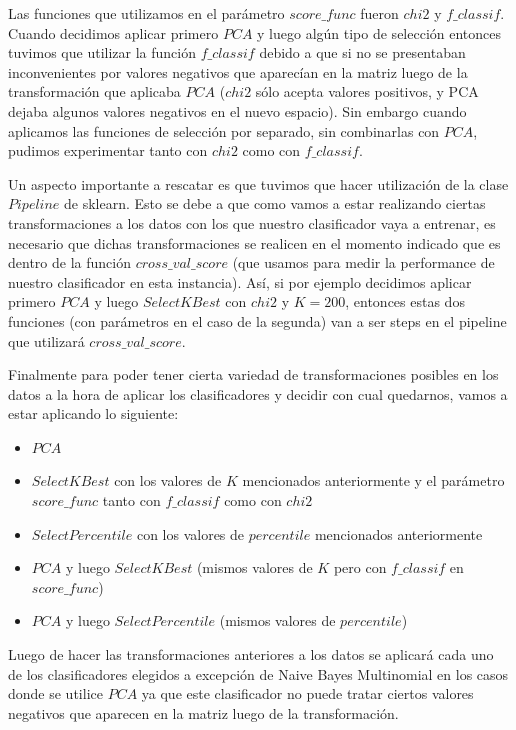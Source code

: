 \documentclass[a4paper]{article}
\begin{document}
Las funciones que utilizamos en el parámetro $score\_func$ fueron $chi2$ y $f\_classif$. Cuando decidimos aplicar primero $PCA$ y luego algún tipo de selección entonces tuvimos que utilizar la función $f\_classif$ debido a que si no se presentaban inconvenientes por valores negativos que aparecían en la matriz luego de la transformación que aplicaba $PCA$ ($chi2$ sólo acepta valores positivos, y PCA dejaba algunos valores negativos en el nuevo espacio). Sin embargo cuando aplicamos las funciones de selección por separado, sin combinarlas con $PCA$, pudimos experimentar tanto con $chi2$ como con $f\_classif$.

Un aspecto importante a rescatar es que tuvimos que hacer utilización de la clase $Pipeline$ de sklearn. Esto se debe a que como vamos a estar realizando ciertas transformaciones a los datos con los que nuestro clasificador vaya a entrenar, es necesario que dichas transformaciones se realicen en el momento indicado que es dentro de la función $cross\_val\_score$ (que usamos para medir la performance de nuestro clasificador en esta instancia). Así, si por ejemplo decidimos aplicar primero $PCA$ y luego $SelectKBest$ con $chi2$ y $K = 200$, entonces estas dos funciones (con parámetros en el caso de la segunda) van a ser steps en el pipeline que utilizará $cross\_val\_score$.

Finalmente para poder tener cierta variedad de transformaciones posibles en los datos a la hora de aplicar los clasificadores y decidir con cual quedarnos, vamos a estar aplicando lo siguiente:
\begin{itemize}
\item $PCA$
\item $SelectKBest$ con los valores de $K$ mencionados anteriormente y el parámetro $score\_func$ tanto con $f\_classif$ como con $chi2$
\item $SelectPercentile$ con los valores de $percentile$ mencionados anteriormente
\item $PCA$ y luego $SelectKBest$ (mismos valores de $K$ pero con $f\_classif$ en $score\_func$)
\item $PCA$ y luego $SelectPercentile$ (mismos valores de $percentile$)
\end{itemize}

Luego de hacer las transformaciones anteriores a los datos se aplicará cada uno de los clasificadores elegidos a excepción de Naive Bayes Multinomial en los casos donde se utilice $PCA$ ya que este clasificador no puede tratar ciertos valores negativos que aparecen en la matriz luego de la transformación.
\end{document}
